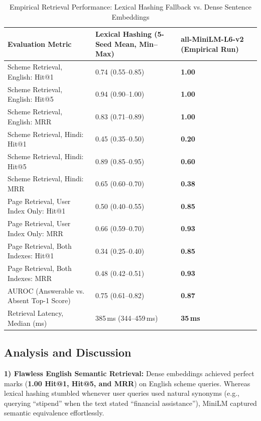 \documentclass[conference]{IEEEtran}
\begin{document}
\begin{table}[t]
\caption{Empirical Retrieval Performance: Lexical Hashing Fallback vs. Dense Sentence Embeddings}
\label{tab:results}
\centering
\small
\begin{tabular}{p{7.2cm}p{4.2cm}p{4.2cm}}
\hline
\textbf{Evaluation Metric} & \textbf{Lexical Hashing (5-Seed Mean, Min--Max)} & \textbf{all-MiniLM-L6-v2 (Empirical Run)} \\
\hline
Scheme Retrieval, English: Hit@1 & 0.74 (0.55--0.85) & \textbf{1.00} \\
Scheme Retrieval, English: Hit@5 & 0.94 (0.90--1.00) & \textbf{1.00} \\
Scheme Retrieval, English: MRR & 0.83 (0.71--0.89) & \textbf{1.00} \\
\hline
Scheme Retrieval, Hindi: Hit@1 & 0.45 (0.35--0.50) & \textbf{0.20} \\
Scheme Retrieval, Hindi: Hit@5 & 0.89 (0.85--0.95) & \textbf{0.60} \\
Scheme Retrieval, Hindi: MRR & 0.65 (0.60--0.70) & \textbf{0.38} \\
\hline
Page Retrieval, User Index Only: Hit@1 & 0.50 (0.40--0.55) & \textbf{0.85} \\
Page Retrieval, User Index Only: MRR & 0.66 (0.59--0.70) & \textbf{0.93} \\
\hline
Page Retrieval, Both Indexes: Hit@1 & 0.34 (0.25--0.40) & \textbf{0.85} \\
Page Retrieval, Both Indexes: MRR & 0.48 (0.42--0.51) & \textbf{0.93} \\
\hline
AUROC (Answerable vs. Absent Top-1 Score) & 0.75 (0.61--0.82) & \textbf{0.87} \\
Retrieval Latency, Median (ms) & 385\,ms (344--459\,ms) & \textbf{35\,ms} \\
\hline
\end{tabular}
\end{table}

\subsection{Analysis and Discussion}

\textbf{1) Flawless English Semantic Retrieval:} Dense embeddings achieved perfect marks (\textbf{1.00 Hit@1, Hit@5, and MRR}) on English scheme queries. Whereas lexical hashing stumbled whenever user queries used natural synonyms (e.g., querying ``stipend'' when the text stated ``financial assistance''), MiniLM captured semantic equivalence effortlessly.
\end{document}

